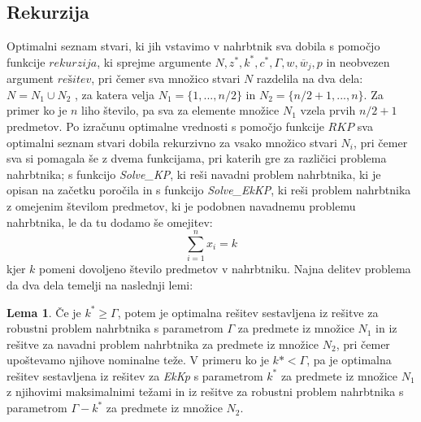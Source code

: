 \documentclass[a4paper,12pt]{article}
\theoremstyle{definition}
\newtheorem{definition}{Lema}
\begin{document}
\subsection{Rekurzija}
\medskip
Optimalni seznam stvari, ki jih vstavimo v nahrbtnik sva dobila s pomočjo funkcije $rekurzija$,
ki sprejme argumente $N, z^*, k^*, c^*,  \Gamma, w, \overline{w}_{j}, p$ in neobvezen argument 
$rešitev$,  pri čemer sva množico stvari $N$ razdelila na dva dela: $N = N_1 \cup N_2$ , za 
katera velja $N_1 = \{1, ..., n / 2\} $ in $N_2 = \{n / 2 + 1, ..., n\}$. Za primer ko je $n$ 
liho število, pa sva za elemente množice $N_1$ vzela prvih $n / 2 + 1$ predmetov. Po izračunu
optimalne vrednosti s pomočjo funkcije $RKP$ sva optimalni seznam stvari dobila rekurzivno za 
vsako množico stvari $N_i$, pri čemer sva si pomagala še z dvema funkcijama, pri katerih gre 
za različici problema nahrbtnika; s funkcijo \textit{Solve\_KP}, ki reši navadni problem
nahrbtnika, ki je opisan na začetku poročila in s funkcijo \textit{Solve\_EkKP}, ki reši 
problem nahrbtnika z omejenim številom predmetov, ki je podobnen navadnemu problemu nahrbtnika, 
le da tu dodamo še omejitev:
\begin{equation}
\tag*{}   
\sum_{i=1}^{n}x_i = k
\end{equation} kjer $k$ pomeni dovoljeno število predmetov v nahrbtniku.
Najna delitev problema da dva dela temelji na naslednji lemi:
\begin{definition}
Če je $k^* \geq \Gamma$, potem je optimalna rešitev sestavljena iz rešitve za robustni problem 
nahrbtnika s parametrom $\Gamma$ za predmete iz množice $N_1$ in iz rešitve za navadni problem 
nahrbtnika za predmete iz množice $N_2$, pri čemer upoštevamo njihove nominalne teže. 
V primeru ko  je $k* < \Gamma$, pa je optimalna rešitev sestavljena iz rešitev za
\textit{E\-kKp} s parametrom $k^*$ za predmete iz množice $N_1$ z njihovimi maksimalnimi 
težami in iz rešitve za robustni problem nahrbtnika s parametrom   $\Gamma - k^*$ za predmete 
iz množice $N_2$.
\end{definition}
\end{document}
